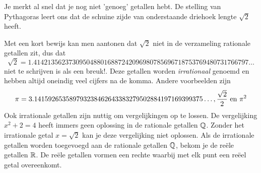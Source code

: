 \documentclass{ximera}
\begin{document}
Je merkt al snel dat je nog niet 'genoeg' getallen hebt. 
De stelling van Pythagoras 
leert ons dat de schuine zijde van onderstaande driehoek lengte \( \sqrt{2}\) heeft. 


\begin{image}[3cm]
    
\end{image}
    
Met een kort bewijs kan men aantonen dat \(\sqrt{2}\) niet in de verzameling rationale getallen zit, dus dat 
\[\sqrt{2} = 1.4142135623730950488016887242096980785696718753769480731766797\ldots%
\]  
niet te schrijven is als een breuk!. 
Deze getallen worden \textit{irrationaal} genoemd en hebben altijd oneindig veel cijfers na de komma.
%
Andere voorbeelden zijn 
\[ \pi = 3.141592653589793238462643383279502884197169399375\ldots%
,
\frac{\sqrt{2}}{2}
\Ten \pi^2 
\]
%
Ook irrationale getallen zijn nuttig om vergelijkingen op te lossen. 
De vergelijking \(x^2 + 2 = 4\) heeft immers geen oplossing in de rationale getallen \( \mathbb{Q} \).
Zonder het irrationale getal \(x = \sqrt{2} \) kan je deze vergelijking niet oplossen.
Als de irrationale getallen worden toegevoegd aan de rationale getallen \(\mathbb{Q}\), bekom je de reële getallen \(\mathbb{R}\). 
De reële getallen vormen een rechte waarbij met elk punt een reëel getal overeenkomt. 



    
    
\end{document}
